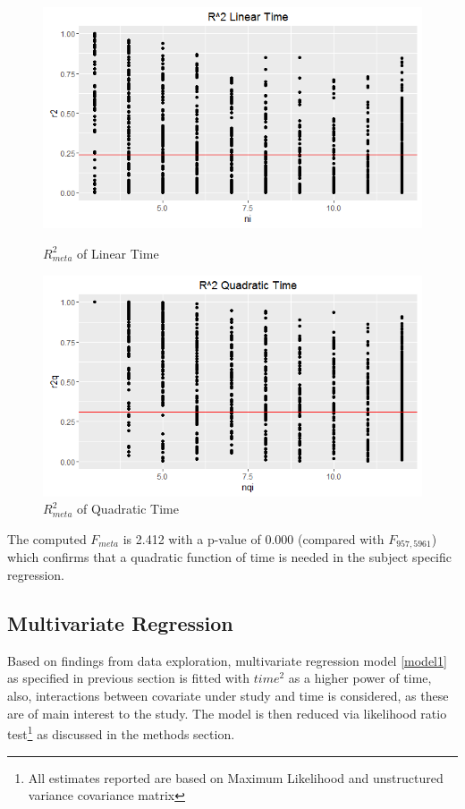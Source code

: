 \documentclass[11pt]{article}
\begin{document}
\begin{figure}[H]
\centering
\begin{minipage}{0.4\textwidth}
\includegraphics[scale=0.5]{r2meta.png}
\caption{$R^2_{meta}$ of Linear Time}
\end{minipage}
\begin{minipage}{0.5\textwidth}
\includegraphics[scale=0.5]{r2metaquad.png}
\caption{$R^2_{meta}$ of Quadratic Time}
\end{minipage}

\end{figure}

The computed $F_{meta}$ is  2.412 with a p-value of 0.000 (compared with $F_{957,5961}$) which confirms that a quadratic function of time is needed in the subject specific regression.

\subsection{Multivariate Regression}
Based on findings from data exploration, multivariate regression model \ref{model1} as specified in previous section is fitted with $time^2$ as a higher power of time, also, interactions between covariate under study and time is considered, as these are of main interest to the study. The model is then reduced via likelihood ratio test\footnote{All estimates reported are based on Maximum Likelihood and unstructured variance covariance matrix} as discussed in the methods section.
\end{document}
